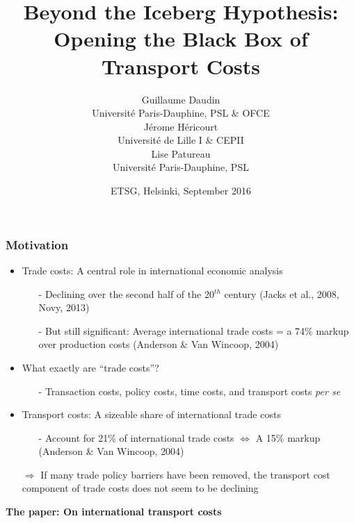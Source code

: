 \documentclass[10 pt,Helvetica, french]{beamer}
\date[September 2016]{ETSG, Helsinki, September 2016}
\title[Trade Costs Black Box]{Beyond the Iceberg Hypothesis: \\Opening the Black Box of Transport Costs}
\author[Daudin et al.]{Guillaume Daudin\\
{\footnotesize Universit\'{e} Paris-Dauphine, PSL \& OFCE }\\ \smallskip
J\'{e}rome H\'{e}ricourt \\
{\footnotesize Universit\'{e} de Lille I \& CEPII }\\  \smallskip
Lise Patureau \\
{\footnotesize  Universit\'{e} Paris-Dauphine, PSL}}
\begin{document}
\begin{frame}[plain]
\titlepage
\end{frame}


\begin{frame}
\frametitle{Motivation}
\begin{itemize}
\item Trade costs: A central role in international economic analysis \vspace{0.1cm}
\begin{itemize}
\item[-] Declining over the second half of the 20$^{th}$ century (Jacks et al., 2008, Novy, 2013) \vspace{0.1cm}
\item[-] But still significant: Average international trade costs = a 74\% markup over production costs (Anderson \& Van Wincoop, 2004)
\end{itemize}
\item What exactly are ``trade costs''?  \vspace{0.1cm}
\begin{itemize}
\item[-] Transaction costs, policy costs, time costs, and transport costs \textit{per se}
\end{itemize}
\item Transport costs: A sizeable share of international trade costs \vspace{0.1cm}
\begin{itemize}
\item[-] Account for 21\% of international trade costs $\Leftrightarrow$ A 15\% markup (Anderson \& Van Wincoop, 2004) \vspace{0.1cm}
\end{itemize}
\item[$\Rightarrow$] If many trade policy barriers have been removed, the transport cost component of trade costs does not seem to be declining\vspace{0.1cm}
\end{itemize}
\textbf{The paper: On international transport costs}

\end{frame}
\end{document}
